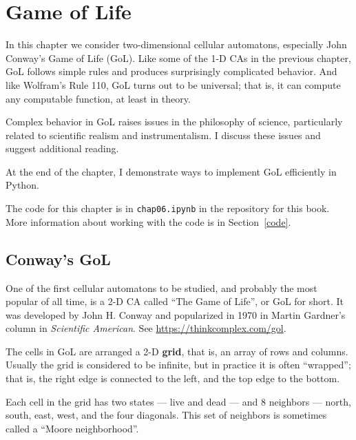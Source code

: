 \documentclass[12pt]{book}
\theoremstyle{exercise}
\begin{document}
\chapter{Game of Life}
\label{lifechap}

In this chapter we consider two-dimensional cellular automatons,
especially John Conway's Game of Life (GoL).  Like some of
the 1-D CAs in the previous chapter, GoL follows simple rules and
produces surprisingly complicated behavior.  And like Wolfram's
Rule 110, GoL turns out to be universal; that is, it can compute
any computable function, at least in theory.


Complex behavior in GoL raises issues in the philosophy of
science, particularly related to scientific realism and instrumentalism.
I discuss these issues and suggest additional reading.

At the end of the chapter, I demonstrate ways to implement
GoL efficiently in Python.

The code for this chapter is in {\tt chap06.ipynb} in the repository
for this book.  More information about working with the code is
in Section~\ref{code}.


\section{Conway's GoL}
\label{life}

One of the first cellular automatons to be studied, and probably the
most popular of all time, is a 2-D CA called ``The Game of Life'', or GoL
for short.  It was developed by John H. Conway and popularized in 1970
in Martin Gardner's column in {\em Scientific American}.
See \url{https://thinkcomplex.com/gol}.


The cells in GoL are arranged a 2-D {\bf grid}, that is, an array of rows and columns.  Usually the grid is considered to be infinite, but in practice it is often ``wrapped''; that is, the right edge is connected to the left, and the top edge to the bottom.

Each cell in the grid has two states --- live and dead --- and 8 neighbors --- north, south, east, west, and the four diagonals.  This set of neighbors
is sometimes called a ``Moore neighborhood''.

\end{document}
